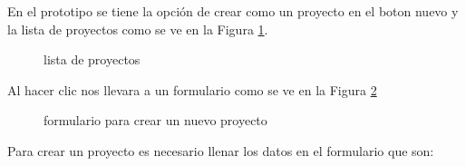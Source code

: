 En el prototipo se tiene la opci\'on de crear como un proyecto en el boton nuevo y la lista de proyectos como se ve en la Figura \ref{fig:homePototype}.
\begin{figure}[H]
\caption{lista de proyectos} \label{fig:homePototype}
\centering
{}
\end{figure}

Al hacer clic nos llevara a un formulario como se ve en la Figura \ref{fig:formnewproject}
\begin{figure}[H]
\caption{formulario para crear un nuevo proyecto} \label{fig:formnewproject}
\centering
{}
\end{figure}
Para crear un proyecto es necesario llenar los datos en el formulario que son:

